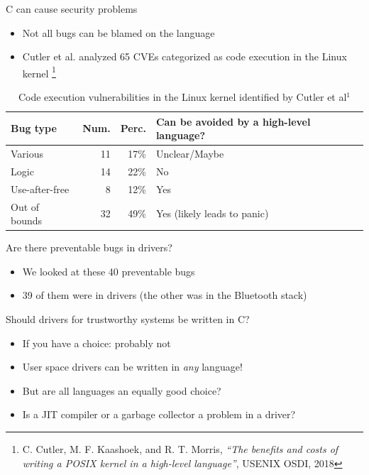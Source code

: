 \documentclass[NET,english,aspectratio=169,notitleframe]{tumbeamer}
\begin{document}
\begin{frame}{C can cause security problems}
\begin{itemize}
\item Not all bugs can be blamed on the language
\item Cutler et al. analyzed 65 CVEs categorized as code execution in the Linux kernel \footnote{C. Cutler, M. F. Kaashoek, and R. T. Morris, \emph{``The benefits and costs of writing a POSIX kernel in a high-level language''}, USENIX OSDI, 2018}
\end{itemize}
\pause
\begin{table}
\centering
\begin{tabular}{ l  r r l }
  \toprule
  Bug type & Num. & Perc. & Can be avoided by a high-level language? \\
  \midrule
  Various & 11 & 17\% & Unclear/Maybe \\
  Logic & 14 & 22\% & No \\
  Use-after-free & 8 & 12\% & Yes \\
  Out of bounds & 32 & 49\% & Yes (likely leads to panic) \\
  \bottomrule  
\end{tabular}
\caption{Code execution vulnerabilities in the Linux kernel identified by Cutler et al$^1$}
\end{table}

\end{frame}

\begin{frame}{Are there preventable bugs in drivers?}
\begin{itemize}
\item We looked at these 40 preventable bugs
\pause
\item 39 of them were in drivers (the other was in the Bluetooth stack)
\end{itemize}
\end{frame}

\begin{frame}{Should drivers for trustworthy systems be written in C?}
\begin{itemize}
\item If you have a choice: probably not
\pause
\item User space drivers can be written in \emph{any} language!
\item But are all languages an equally good choice?
\item Is a JIT compiler or a garbage collector a problem in a driver?
\end{itemize}
\end{frame}
\end{document}
